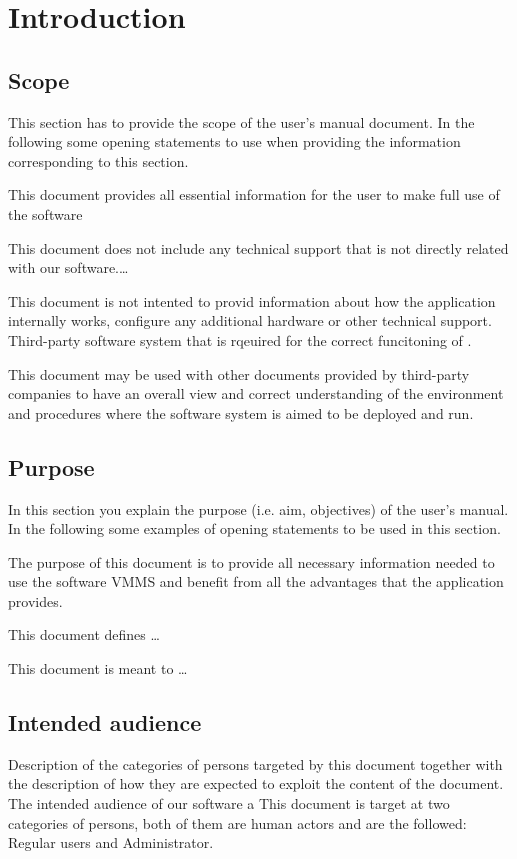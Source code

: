 \chapter{Introduction}
\label{chap:introduction}

\section{Scope}
 
This section has to provide the scope of the user's manual document.
In the following some opening statements to use when providing the
information corresponding to this section.

This document provides all essential information for the user to make full
use of the software \mysystemname


This document does not include any technical support that is not directly
related with our software.\ldots
 
This document is not intented to provid information about how the application
internally works, configure any additional hardware or other technical
support. Third-party software system that is rqeuired for the correct
funcitoning of \mysystemname.

 
This document may be used with other documents provided by third-party
companies to have an overall view and correct understanding of the environment
and procedures where the software system \mysystemname is aimed to be deployed
and run.




\section{Purpose}
In this section you explain the purpose (i.e. aim, objectives) of the user's
manual. In the following some examples of opening statements to be used in this
section.

The purpose of this document is to provide all necessary information
needed to use the software VMMS and benefit from all the advantages that the
application provides.

This document defines \ldots

This document is meant to \ldots



\section{Intended audience}
Description of the categories of persons targeted by this document together with the description of how they are expected to exploit the content of the document.
The intended audience of our software a
This document is target at two categories of persons, both of them are human
actors and are the followed: Regular users and Administrator.\\\\


